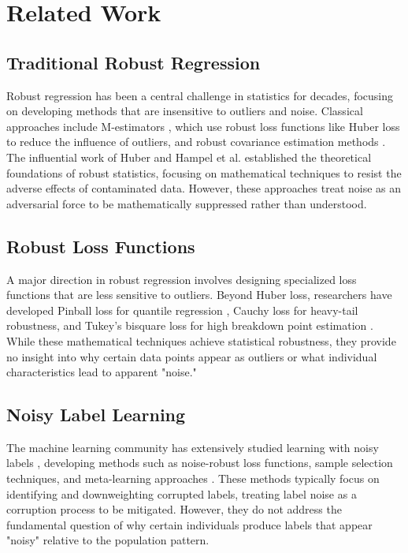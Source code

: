 \documentclass[letterpaper]{article} %
\begin{document}
\section{Related Work}

\subsection{Traditional Robust Regression}
Robust regression has been a central challenge in statistics for decades, focusing on developing methods that are insensitive to outliers and noise. Classical approaches include M-estimators \cite{huber1964robust}, which use robust loss functions like Huber loss to reduce the influence of outliers, and robust covariance estimation methods \cite{rousseeuw1987robust}. The influential work of Huber \cite{huber2009robust} and Hampel et al. \cite{hampel1986robust} established the theoretical foundations of robust statistics, focusing on mathematical techniques to resist the adverse effects of contaminated data. However, these approaches treat noise as an adversarial force to be mathematically suppressed rather than understood.

\subsection{Robust Loss Functions}
A major direction in robust regression involves designing specialized loss functions that are less sensitive to outliers. Beyond Huber loss, researchers have developed Pinball loss for quantile regression \cite{koenker1978regression}, Cauchy loss for heavy-tail robustness, and Tukey's bisquare loss for high breakdown point estimation \cite{maronna2019robust}. While these mathematical techniques achieve statistical robustness, they provide no insight into why certain data points appear as outliers or what individual characteristics lead to apparent "noise."

\subsection{Noisy Label Learning}
The machine learning community has extensively studied learning with noisy labels \cite{natarajan2013learning}, developing methods such as noise-robust loss functions, sample selection techniques, and meta-learning approaches \cite{han2018co}. These methods typically focus on identifying and downweighting corrupted labels, treating label noise as a corruption process to be mitigated. However, they do not address the fundamental question of why certain individuals produce labels that appear "noisy" relative to the population pattern.
\end{document}
